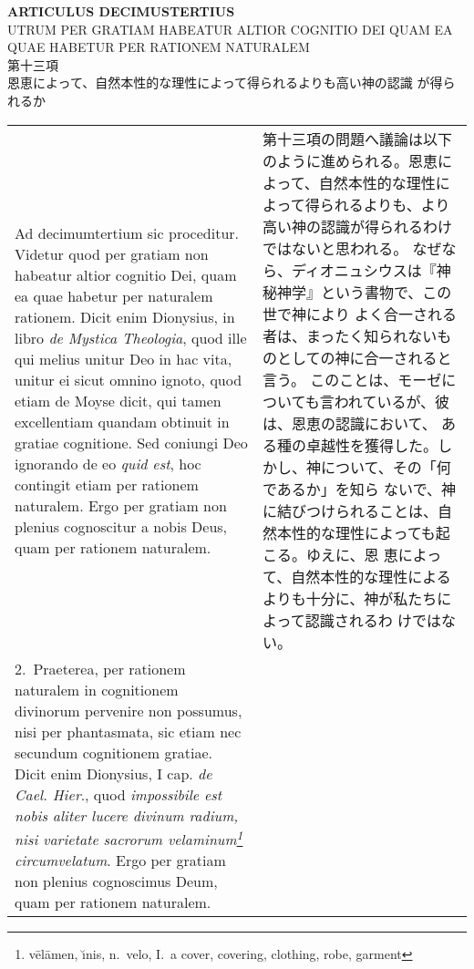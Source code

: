 \documentclass[10pt]{jsarticle} %
\begin{document}
\newpage
{}

\begin{center}
 {\Large {\bf ARTICULUS DECIMUSTERTIUS}}\\
{\large UTRUM PER GRATIAM HABEATUR ALTIOR COGNITIO DEI QUAM EA QUAE
 HABETUR PER RATIONEM NATURALEM}\\
{\large 第十三項\\恩恵によって、自然本性的な理性によって得られるよりも高い神の認識
 が得られるか}
\end{center}

\begin{longtable}{p{21em}p{21em}}

{\sc Ad decimumtertium sic proceditur}. Videtur quod per gratiam non
habeatur altior cognitio Dei, quam ea quae habetur per naturalem
rationem. Dicit enim Dionysius, in libro {\it de Mystica Theologia},
quod ille qui melius unitur Deo in hac vita, unitur ei sicut omnino
ignoto, quod etiam de Moyse dicit, qui tamen excellentiam quandam
obtinuit in gratiae cognitione. Sed coniungi Deo ignorando de eo {\it
quid est}, hoc contingit etiam per rationem naturalem. Ergo per
gratiam non plenius cognoscitur a nobis Deus, quam per rationem
naturalem.

&

第十三項の問題へ議論は以下のように進められる。恩恵によって、自然本性的な理性に
よって得られるよりも、より高い神の認識が得られるわけではないと思われる。
なぜなら、ディオニュシウスは『神秘神学』という書物で、この世で神により
よく合一される者は、まったく知られないものとしての神に合一されると言う。
このことは、モーゼについても言われているが、彼は、恩恵の認識において、
ある種の卓越性を獲得した。しかし、神について、その「何であるか」を知ら
ないで、神に結びつけられることは、自然本性的な理性によっても起こる。ゆえに、恩
恵によって、自然本性的な理性によるよりも十分に、神が私たちによって認識されるわ
けではない。

\\

2.~{\sc Praeterea}, per rationem naturalem in cognitionem divinorum
pervenire non possumus, nisi per phantasmata, sic etiam nec secundum
cognitionem gratiae. Dicit enim Dionysius, I cap. {\it de
Cael. Hier}., quod {\it impossibile est nobis aliter lucere divinum
radium, nisi varietate sacrorum velaminum\footnote{v\={e}l\={a}men,
\u{\i}nis, n.\ velo, I.~a cover, covering, clothing, robe, garment}
circumvelatum}. Ergo per gratiam non plenius cognoscimus Deum, quam
per rationem naturalem.

&


\end{longtable}
\end{document}
